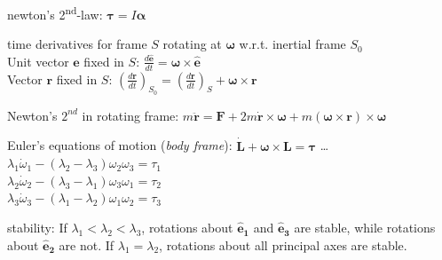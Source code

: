 \documentclass[letterpaper,landscape,10pt]{article}
\newenvironment{mydescription}
{\begin{description}
	\setlength{\itemsep}{0pt}
	\setlength{\parskip}{0pt}
	\setlength{\parsep}{-1pt}}
{\end{description}}
\begin{document}
{\begin{multicols}{4}
\begin{mydescription}
			\item[newton's 2\textsuperscript{nd}-law:]
					$\bm{\tau} = I\bm{\alpha}$
			\item[time derivatives] for frame $S$ rotating at $\bm{\omega}$ w.r.t. inertial frame $S_0$ \\
			  		Unit vector $\hat{\bm{e}}$ fixed in $S$: $\frac{d\hat{\bm{e}}}{dt}=\bm{\omega}\times\hat{\bm{e}}$ \\
					Vector $\bm{r}$ fixed in $S$: $\left( \frac{d\bm{r}}{dt}
			  		\right)_{S_0} = \left( \frac{d\bm{r}}{dt} \right)_{S} +
			  		\bm{\omega} \times \bm{r}\,$
			\item[Newton's $2^{nd}$ in rotating frame:] $m\ddot{\bm{r}} =
			  \bm{F}+2m\dot{\bm{r}}\times\bm{\omega}+m\left(
			  \bm{\omega\times\bm{r}} \right)\times\bm{\omega}$
			\item[Euler's equations of motion (\emph{body frame}):]
			  $\dot{\bm{L}}+\bm{\omega}\times\bm{L}=\bm\tau$ \dots \\
			  $ \lambda_1\dot\omega_1-\left( \lambda_2-\lambda_3 \right)\omega_2\omega_3 = \tau_1 $ \\
			  $ \lambda_2\dot\omega_2-\left( \lambda_3-\lambda_1 \right)\omega_3\omega_1 = \tau_2 $ \\
			  $ \lambda_3\dot\omega_3-\left( \lambda_1-\lambda_2 \right)\omega_1\omega_2 = \tau_3 $
			\item[stability:] If $\lambda_1<\lambda_2<\lambda_3$, rotations
			  about $\bm{\hat{e}_1}$ and $\bm{\hat{e}_3}$ are stable, while
			  rotations about  $\bm{\hat{e}_2}$ are not. If
			  $\lambda_1=\lambda_2$, rotations about all principal axes are
			  stable.
		\end{mydescription}
	

\end{multicols}}
\end{document}
